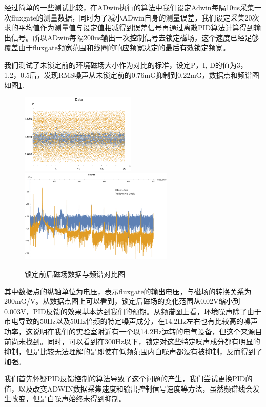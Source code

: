 \documentclass[onecolumn,a4paper,10pt]{article}
\begin{document}
经过简单的一些测试比较，在ADwin执行的算法中我们设定Adwin每隔10us采集一次fluxgate的测量数据，同时为了减小ADwin自身的测量误差，我们设定采集20次求的平均值作为测量值与设定值相减得到误差信号再通过离散PID算法计算得到输出信号。所以ADwin每隔200us输出一次控制信号去锁定磁场，这个速度已经足够覆盖由于fluxgate频宽范围和线圈的响应频宽决定的最后有效锁定频宽。

我们测试了未锁定前的环境磁场大小作为对比的标准，设定P，I,  D的值为3，1.2，0.5后，发现RMS噪声从未锁定前的0.76mG抑制到0.22mG，数据点和频谱图如图\ref{fig:1022}.

\begin{figure}[htbp]
\centering
\includegraphics[height=1.5in]{DataMultimeter}%
\hspace{0.4in}%
\includegraphics[height=1.75in]{FourierMultimeter}
\caption{锁定前后磁场数据与频谱对比图}
\label{fig:1022}
\end{figure}

其中数据点的纵轴单位为电压，表示fluxgate的输出电压，与磁场的转换关系为200mG/V。从数据点图上可以看到，锁定后磁场的变化范围从0.02V缩小到0.003V，PID反馈的效果基本达到我们的预期。从频谱图上看，环境噪声除了由于市电导致的50Hz以及50Hz倍频的特定噪声成分，在14.2Hz左右也有比较高的噪声功率，这说明在我们的实验室附近有一个以14.2Hz运转的电气设备，但这个来源目前尚未找到。同时，可以看到在300Hz以下，锁定对这些特定噪声成分都有明显的抑制，但是比较无法理解的是即使在低频范围内白噪声都没有被抑制，反而得到了加强。

我们首先怀疑PID反馈控制的算法导致了这个问题的产生，我们尝试更换PID的值，以及改变ADWIN数据采集速度和输出控制信号速度等方法，虽然频谱线会发生改变，但是白噪声始终未得到抑制。
\end{document}
